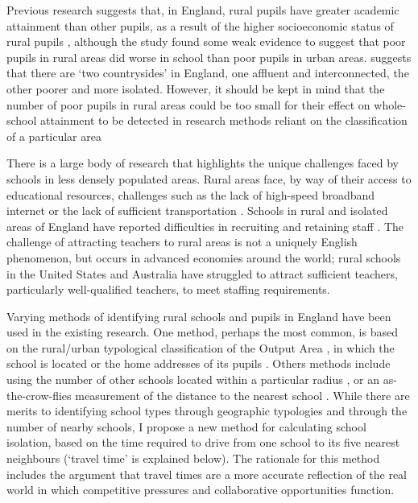 \documentclass[12pt, a4paper]{article}
\begin{document}
Previous research suggests that, in England, rural pupils have greater academic attainment than other pupils, as a result of the higher socioeconomic status of rural pupils \autocites{nationalcentreforsocialresearch2009}, although the study found some weak evidence to suggest that poor pupils in rural areas did worse in school than poor pupils in urban areas. \textcite{pateman2011} suggests that there are `two countrysides' in England, one affluent and interconnected, the other poorer and more isolated. However, it should be kept in mind that the number of poor pupils in rural areas could be too small for their effect on whole-school attainment to be detected in research methods reliant on the classification of a particular area

There is a large body of research that highlights the unique challenges faced by schools in less densely populated areas. Rural areas face, by way of their access to educational resources, challenges such as the lack of high-speed broadband internet \autocites{ofcom2013, williams2015, townsend2013} or the lack of sufficient transportation \autocites{hammond1995, morgan2013}. Schools in rural and isolated areas of England have reported difficulties in recruiting and retaining staff \autocite{ovenden-hope2015}. The challenge of attracting teachers to rural areas is not a uniquely English phenomenon, but occurs in advanced economies around the world; rural schools in the United States \autocites{fowles2014, maranto2012} and Australia \autocites{halsey2014, sullivan2013} have struggled to attract sufficient teachers, particularly well-qualified teachers, to meet staffing requirements. 

Varying methods of identifying rural schools and pupils in England have been used in the existing research. One method, perhaps the most common, is based on the rural/urban typological classification of the Output Area \autocites{bibby2004}, in which the school is located or the home addresses of its pupils \autocite[as used by][]{midouhas2015, nationalcentreforsocialresearch2009, bynner2002}. Others methods include using the number of other schools located within a particular radius \autocites[such as the 2km radius used by][]{gibbons2008a}, or an as-the-crow-flies measurement of the distance to the nearest school \autocites[as used by][]{theobald2015}. While there are merits to identifying school types through geographic typologies and through the number of nearby schools, I propose a new method for calculating school isolation, based on the time required to drive from one school to its five nearest neighbours (`travel time' is explained below). The rationale for this method includes the argument that travel times are a more accurate reflection of the real world in which competitive pressures and collaborative opportunities function. 
\end{document}
